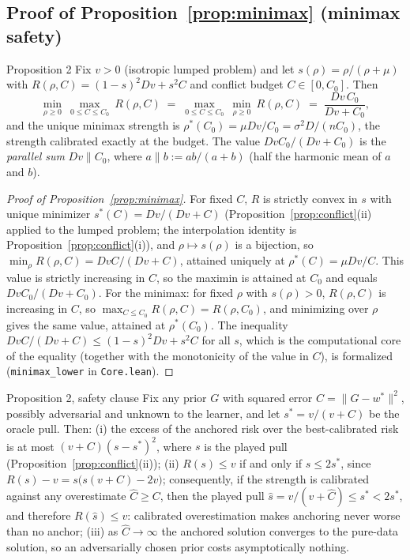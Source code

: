 \subsection{Proof of Proposition~\ref{prop:minimax} (minimax safety)}
\label{app:proof-minimax}

\begin{restated}{Proposition 2}
Fix $v > 0$ (isotropic lumped problem) and let $s(\rho) = \rho/(\rho + \mu)$ with $R(\rho, C) = (1 - s)^2 Dv + s^2 C$ and conflict budget $C \in [0, C_0]$.
Then
\[
  \min_{\rho \ge 0}\ \max_{0 \le C \le C_0}\ R(\rho, C)
  \;=\;
  \max_{0 \le C \le C_0}\ \min_{\rho \ge 0}\ R(\rho, C)
  \;=\;
  \frac{Dv\,C_0}{Dv + C_0},
\]
and the unique minimax strength is $\rho^*(C_0) = \mu Dv/C_0 = \sigma^2 D/(n C_0)$, the strength calibrated exactly at the budget.
The value $DvC_0/(Dv + C_0)$ is the \emph{parallel sum} $Dv \parallel C_0$, where $a \parallel b := ab/(a+b)$ (half the harmonic mean of $a$ and $b$).
\end{restated}

\begin{proof}[Proof of Proposition~\ref{prop:minimax}]
For fixed $C$, $R$ is strictly convex in $s$ with unique minimizer $s^*(C) = Dv/(Dv + C)$ (Proposition~\ref{prop:conflict}(ii) applied to the lumped problem; the interpolation identity is Proposition~\ref{prop:conflict}(i)), and $\rho \mapsto s(\rho)$ is a bijection, so $\min_\rho R(\rho, C) = DvC/(Dv + C)$, attained uniquely at $\rho^*(C) = \mu Dv/C$.
This value is strictly increasing in $C$, so the maximin is attained at $C_0$ and equals $DvC_0/(Dv + C_0)$.
For the minimax: for fixed $\rho$ with $s(\rho) > 0$, $R(\rho, C)$ is increasing in $C$, so $\max_{C \le C_0} R(\rho, C) = R(\rho, C_0)$, and minimizing over $\rho$ gives the same value, attained at $\rho^*(C_0)$.
The inequality $DvC/(Dv + C) \le (1 - s)^2 Dv + s^2 C$ for all $s$, which is the computational core of the equality (together with the monotonicity of the value in $C$), is formalized (\texttt{minimax\_lower} in \texttt{Core.lean}).
\end{proof}

\begin{restated}{Proposition 2, safety clause}
Fix any prior $G$ with squared error $C = \lVert G - w^*\rVert^2$, possibly adversarial and unknown to the learner, and let $s^* = v/(v + C)$ be the oracle pull.
Then:
(i) the excess of the anchored risk over the best-calibrated risk is at most $(v + C)(s - s^*)^2$, where $s$ is the played pull (Proposition~\ref{prop:conflict}(ii));
(ii) $R(s) \le v$ if and only if $s \le 2s^*$, since $R(s) - v = s\bigl(s(v + C) - 2v\bigr)$; consequently, if the strength is calibrated against any overestimate $\widehat C \ge C$, then the played pull $\widehat s = v/(v + \widehat C) \le s^* < 2s^*$, and therefore $R(\widehat s) \le v$: calibrated overestimation makes anchoring never worse than no anchor;
(iii) as $\widehat C \to \infty$ the anchored solution converges to the pure-data solution, so an adversarially chosen prior costs asymptotically nothing.
\end{restated}


